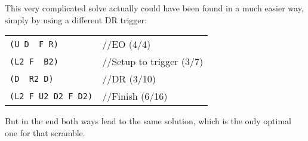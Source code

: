 \documentclass[11pt,a4paper]{book}
\newcommand{\p}{\textquotesingle}
\newcommand{\m}{\texttt}
\newcommand{\ps}{\p\,\,}
\newcommand{\comment}[1]{{\color{gray}\quad//#1}}
\begin{document}
This very complicated solve actually could have been found in a much easier way, simply by using a different DR trigger:

\begin{center}
\begin{tabular}{ll}
\m{(U D\ps F R)} & \comment{EO (4/4)}\\
\m{(L2 F\ps B2)} & \comment{Setup to trigger (3/7)}\\
\m{(D\ps R2 D\p)} & \comment{DR (3/10)}\\
\m{(L2 F U2 D2 F D2)} & \comment{Finish (6/16)}\\
\end{tabular}
\end{center}


But in the end both ways lead to the same solution, which is the only optimal one for that scramble.
\end{document}

